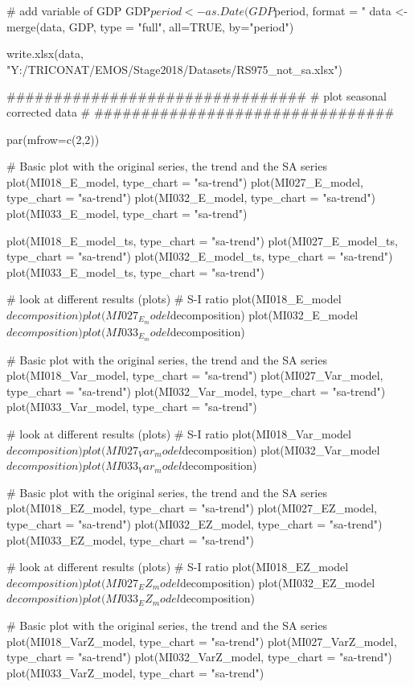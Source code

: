\begin{lstlinsting}
# add variable of GDP
GDP$period <- as.Date(GDP$period, format = "%
data <- merge(data, GDP, type = "full", all=TRUE, by="period")


write.xlsx(data, "Y:/TRICONAT/EMOS/Stage2018/Datasets/RS975_not_sa.xlsx") 



################################
# plot seasonal corrected data #
################################

par(mfrow=c(2,2))

# Basic plot with the original series, the trend and the SA series
plot(MI018_E_model, type_chart = "sa-trend")
plot(MI027_E_model, type_chart = "sa-trend")
plot(MI032_E_model, type_chart = "sa-trend")
plot(MI033_E_model, type_chart = "sa-trend")

plot(MI018_E_model_ts, type_chart = "sa-trend")
plot(MI027_E_model_ts, type_chart = "sa-trend")
plot(MI032_E_model_ts, type_chart = "sa-trend")
plot(MI033_E_model_ts, type_chart = "sa-trend")

# look at different results (plots)
# S-I ratio
plot(MI018_E_model$decomposition)
plot(MI027_E_model$decomposition)
plot(MI032_E_model$decomposition)
plot(MI033_E_model$decomposition)


# Basic plot with the original series, the trend and the SA series
plot(MI018_Var_model, type_chart = "sa-trend")
plot(MI027_Var_model, type_chart = "sa-trend")
plot(MI032_Var_model, type_chart = "sa-trend")
plot(MI033_Var_model, type_chart = "sa-trend")

# look at different results (plots)
# S-I ratio
plot(MI018_Var_model$decomposition)
plot(MI027_Var_model$decomposition)
plot(MI032_Var_model$decomposition)
plot(MI033_Var_model$decomposition)

# Basic plot with the original series, the trend and the SA series
plot(MI018_EZ_model, type_chart = "sa-trend")
plot(MI027_EZ_model, type_chart = "sa-trend")
plot(MI032_EZ_model, type_chart = "sa-trend")
plot(MI033_EZ_model, type_chart = "sa-trend")

# look at different results (plots)
# S-I ratio
plot(MI018_EZ_model$decomposition)
plot(MI027_EZ_model$decomposition)
plot(MI032_EZ_model$decomposition)
plot(MI033_EZ_model$decomposition)


# Basic plot with the original series, the trend and the SA series
plot(MI018_VarZ_model, type_chart = "sa-trend")
plot(MI027_VarZ_model, type_chart = "sa-trend")
plot(MI032_VarZ_model, type_chart = "sa-trend")
plot(MI033_VarZ_model, type_chart = "sa-trend")


\end{lstlinsting}
